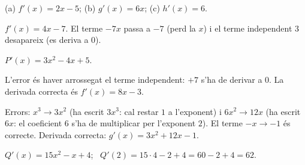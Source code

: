 \begin{solucions}
\begin{sollist}
  \item (a) $f'(x)=2x-5$; \quad (b) $g'(x)=6x$; \quad (c) $h'(x)=6$.
  \item $f'(x)=4x-7$. El terme $-7x$ passa a $-7$ (perd la $x$) i el terme independent
        $3$ desapareix (es deriva a $0$).
  \item $P'(x)=3x^2-4x+5$.
  \item L'error és haver arrossegat el terme independent: $+7$ s'ha de derivar a $0$. La
        derivada correcta és $f'(x)=8x-3$.
  \item Errors: $x^3\to 3x^2$ (ha escrit $3x^3$: cal restar $1$ a l'exponent) i
        $6x^2\to 12x$ (ha escrit $6x$: el coeficient $6$ s'ha de multiplicar per
        l'exponent $2$). El terme $-x\to -1$ és correcte. Derivada correcta:
        $g'(x)=3x^2+12x-1$.
  \item $Q'(x)=15x^2-x+4$; \ $Q'(2)=15\cdot 4-2+4=60-2+4=62$.
\end{sollist}
\end{solucions}
